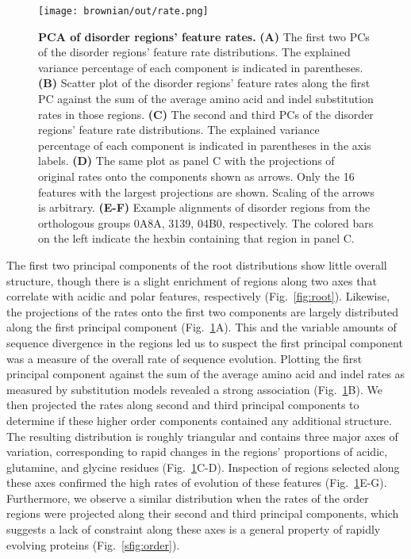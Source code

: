 \begin{figure}[h!]
\texttt{[image: brownian/out/rate.png]}
\centering
\caption{\textbf{PCA of disorder regions' feature rates.}
\textbf{(A)} The first two PCs of the disorder regions' feature rate distributions. The explained variance percentage of each component is indicated in parentheses. \textbf{(B)} Scatter plot of the disorder regions' feature rates along the first PC against the sum of the average amino acid and indel substitution rates in those regions. \textbf{(C)} The second and third PCs of the disorder regions' feature rate distributions. The explained variance percentage of each component is indicated in parentheses in the axis labels. \textbf{(D)} The same plot as panel C with the projections of original rates onto the components shown as arrows. Only the 16 features with the largest projections are shown. Scaling of the arrows is arbitrary. \textbf{(E-F)} Example alignments of disorder regions from the orthologous groups 0A8A, 3139, 04B0, respectively. The colored bars on the left indicate the hexbin containing that region in panel C.}
\label{fig:rate}
\end{figure}

The first two principal components of the root distributions show little overall structure, though there is a slight enrichment of regions along two axes that correlate with acidic and polar features, respectively (Fig.~\ref{fig:root}). Likewise, the projections of the rates onto the first two components are largely distributed along the first principal component (Fig.~\ref{fig:rate}A). This and the variable amounts of sequence divergence in the regions led us to suspect the first principal component was a measure of the overall rate of sequence evolution. Plotting the first principal component against the sum of the average amino acid and indel rates as measured by substitution models revealed a strong association (Fig.~\ref{fig:rate}B). We then projected the rates along second and third principal components to determine if these higher order components contained any additional structure. The resulting distribution is roughly triangular and contains three major axes of variation, corresponding to rapid changes in the regions' proportions of acidic, glutamine, and glycine residues (Fig.~\ref{fig:rate}C-D). Inspection of regions selected along these axes confirmed the high rates of evolution of these features (Fig.~\ref{fig:rate}E-G). Furthermore, we observe a similar distribution when the rates of the order regions were projected along their second and third principal components, which suggests a lack of constraint along these axes is a general property of rapidly evolving proteins (Fig.~\ref{sfig:order}).

